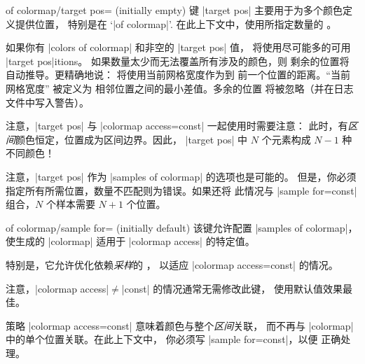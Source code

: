 {\begin{enumerate}
\begin{pgfplotskey}{of colormap/target pos= (initially empty)}
            键 |target pos| 主要用于为多个颜色定义提供位置，
            特别是在
            `|of colormap|'. 在此上下文中，使用所指定数量的 。

            如果你有 |colors of colormap| 和非空的
            |target pos| 值，\PGFPlots{} 将使用尽可能多的可用 |target pos|itions。
            如果数量太少而无法覆盖所有涉及的颜色，则
            剩余的位置将自动推导。更精确地说：
            \PGFPlots{} 将使用当前网格宽度作为到
            前一个位置的距离。``当前网格宽度'' 被定义为
            相邻位置之间的最小差值。多余的位置
            将被忽略（并在日志文件中写入警告）。


            注意，|target pos| 与 |colormap access=const| 一起使用时需要注意：
            此时，有\emph{区间}颜色恒定，位置成为区间边界。因此，
            |target pos| 中 $N$ 个元素构成 $N-1$ 种不同颜色！

            注意，|target pos| 作为 |samples of colormap| 的选项也是可能的。
            但是，你必须指定所有所需位置，数量不匹配则为错误。如果还将
            此情况与 |sample for=const| 组合，$N$ 个样本需要 $N+1$ 个位置。
        \end{pgfplotskey}

        \begin{pgfplotskey}{of colormap/sample for= (initially default)}
            该键允许配置 |samples of colormap|，使生成的 |colormap|
            适用于 |colormap access| 的特定值。

            特别是，它允许优化依赖\emph{采样}的 ，
            以适应 |colormap access=const| 的情况。

            注意，|colormap access|$\neq$|const| 的情况通常无需修改此键，
            使用默认值效果最佳。

            策略 |colormap access=const| 意味着颜色与整个\emph{区间}关联，
            而不再与 |colormap| 中的单个位置关联。在此上下文中，
            你必须写 |sample for=const|，以便 \PGFPlots{} 正确处理。


\end{pgfplotskey}
\end{enumerate}}
